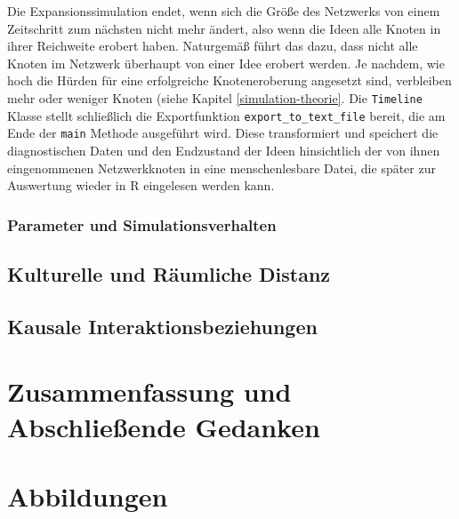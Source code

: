 \documentclass[openany,twoside,twocolumn]{book}
\let\pby\printbibliography
\renewcommand{\printbibliography}{}
\begin{document}
Die Expansionssimulation endet, wenn sich die Größe des Netzwerks von
einem Zeitschritt zum nächsten nicht mehr ändert, also wenn die Ideen
alle Knoten in ihrer Reichweite erobert haben. Naturgemäß führt das
dazu, dass nicht alle Knoten im Netzwerk überhaupt von einer Idee
erobert werden. Je nachdem, wie hoch die Hürden für eine erfolgreiche
Knoteneroberung angesetzt sind, verbleiben mehr oder weniger Knoten
(siehe Kapitel \ref{simulation-theorie}. Die \texttt{Timeline} Klasse
stellt schließlich die Exportfunktion \texttt{export\_to\_text\_file}
bereit, die am Ende der \texttt{main} Methode ausgeführt wird. Diese
transformiert und speichert die diagnostischen Daten und den Endzustand
der Ideen hinsichtlich der von ihnen eingenommenen Netzwerkknoten in
eine menschenlesbare Datei, die später zur Auswertung wieder in R
eingelesen werden kann.

\hypertarget{simulation-parameters}{%
\subsection{Parameter und
Simulationsverhalten}\label{simulation-parameters}}

\hypertarget{kulturelle-und-raumliche-distanz}{%
\section{Kulturelle und Räumliche
Distanz}\label{kulturelle-und-raumliche-distanz}}

\hypertarget{kausale-interaktionsbeziehungen}{%
\section{Kausale
Interaktionsbeziehungen}\label{kausale-interaktionsbeziehungen}}

\pby[title={Literatur},segment=\therefsegment,heading=subbibintoc]

\hypertarget{zusammenfassung-und-abschlieende-gedanken}{%
\chapter{Zusammenfassung und Abschließende
Gedanken}\label{zusammenfassung-und-abschlieende-gedanken}}

\hypertarget{abbildungen}{%
\chapter{Abbildungen}\label{abbildungen}}

\printbibliography
\end{document}
